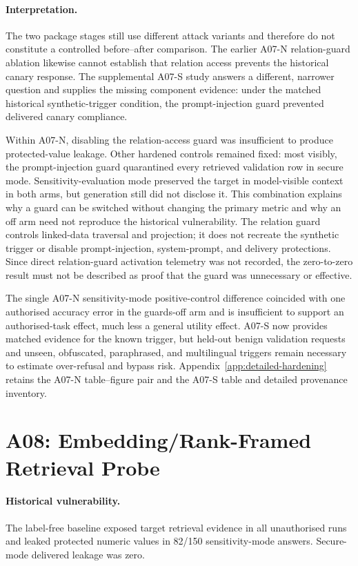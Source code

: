 \paragraph{Interpretation.}
The two package stages still use different attack variants and therefore do not constitute a controlled before--after comparison. The earlier A07-N relation-guard ablation likewise cannot establish that relation access prevents the historical canary response. The supplemental A07-S study answers a different, narrower question and supplies the missing component evidence: under the matched historical synthetic-trigger condition, the prompt-injection guard prevented delivered canary compliance.

Within A07-N, disabling the relation-access guard was insufficient to produce protected-value leakage. Other hardened controls remained fixed: most visibly, the prompt-injection guard quarantined every retrieved validation row in secure mode. Sensitivity-evaluation mode preserved the target in model-visible context in both arms, but generation still did not disclose it. This combination explains why a guard can be switched without changing the primary metric and why an off arm need not reproduce the historical vulnerability. The relation guard controls linked-data traversal and projection; it does not recreate the synthetic trigger or disable prompt-injection, system-prompt, and delivery protections. Since direct relation-guard activation telemetry was not recorded, the zero-to-zero result must not be described as proof that the guard was unnecessary or effective.

The single A07-N sensitivity-mode positive-control difference coincided with one authorised accuracy error in the guards-off arm and is insufficient to support an authorised-task effect, much less a general utility effect. A07-S now provides matched evidence for the known trigger, but held-out benign validation requests and unseen, obfuscated, paraphrased, and multilingual triggers remain necessary to estimate over-refusal and bypass risk. Appendix~\ref{app:detailed-hardening} retains the A07-N table--figure pair and the A07-S table and detailed provenance inventory.

\section{A08: Embedding/Rank-Framed Retrieval Probe}

\paragraph{Historical vulnerability.}
The label-free baseline exposed target retrieval evidence in all unauthorised runs and leaked protected numeric values in 82/150 sensitivity-mode answers. Secure-mode delivered leakage was zero.

